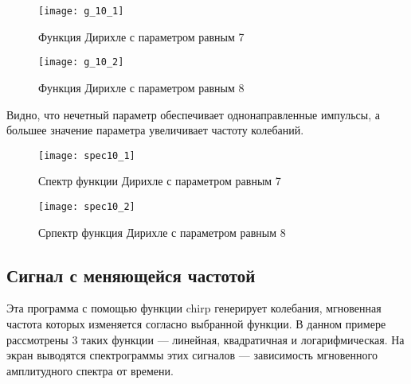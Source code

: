 \begin{figure}[H]
	\begin{center}
		\texttt{[image: g\_10\_1]}
		\caption{Функция Дирихле с параметром равным 7} 
		\label{pic:g_10_1} %
	\end{center}
\end{figure}
\begin{figure}[H]
	\begin{center}
		\texttt{[image: g\_10\_2]}
		\caption{Функция Дирихле с параметром равным 8} 
		\label{pic:g_10_2} %
	\end{center}
\end{figure}
Видно, что нечетный параметр обеспечивает однонаправленные импульсы, а большее значение параметра увеличивает частоту колебаний.

\begin{figure}[H]
	\begin{center}
		\texttt{[image: spec10\_1]}
		\caption{Спектр функции Дирихле с параметром равным 7} 
		\label{pic:spec10_1} %
	\end{center}
\end{figure}
\begin{figure}[H]
	\begin{center}
		\texttt{[image: spec10\_2]}
		\caption{Српектр функция Дирихле с параметром равным 8} 
		\label{pic:spec10_2} %
	\end{center}
\end{figure}

\subsection{Сигнал с меняющейся частотой}


\parindent=1cm
Эта программа с помощью функции chirp генерирует колебания, мгновенная частота которых изменяется согласно выбранной функции. В данном примере рассмотрены 3 таких функции — линейная, квадратичная и логарифмическая. На экран выводятся спектрограммы этих сигналов — зависимость мгновенного амплитудного спектра от времени.

